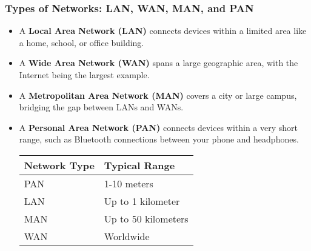\documentclass{beamer}
\begin{document}
\begin{frame}
    \frametitle{Types of Networks: LAN, WAN, MAN, and PAN}
    
    \begin{itemize}
        \item A \textbf{Local Area Network (LAN)} connects devices within a limited area like a home, school, or office building.
        
        \item A \textbf{Wide Area Network (WAN)} spans a large geographic area, with the Internet being the largest example.
        
        \item A \textbf{Metropolitan Area Network (MAN)} covers a city or large campus, bridging the gap between LANs and WANs.
        
        \item A \textbf{Personal Area Network (PAN)} connects devices within a very short range, such as Bluetooth connections between your phone and headphones.
        
        \begin{table}
            \begin{tabular}{|l|l|}
                \hline
                Network Type & Typical Range \\
                \hline
                PAN & 1-10 meters \\
                LAN & Up to 1 kilometer \\
                MAN & Up to 50 kilometers \\
                WAN & Worldwide \\
                \hline
            \end{tabular}
        \end{table}
    \end{itemize}
\end{frame}
\end{document}
